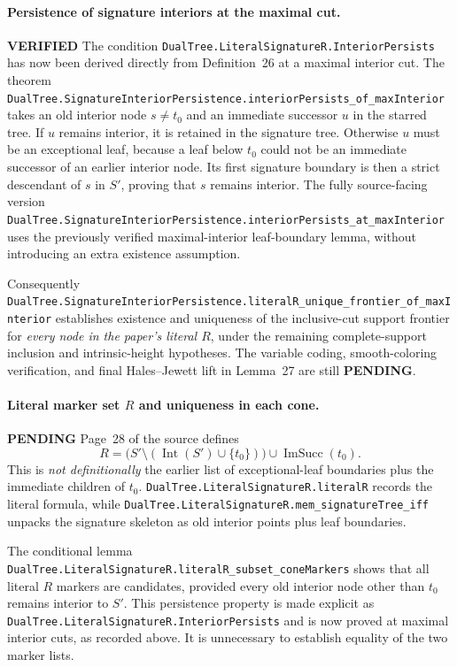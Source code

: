 \documentclass[11pt]{article}
\newcommand{\ok}{\textcolor{green!40!black}{\textbf{VERIFIED}}}
\newcommand{\todo}{\textcolor{gray!70!black}{\textbf{PENDING}}}
\newcommand{\lean}[1]{\texttt{#1}}
\begin{document}
\paragraph{Persistence of signature interiors at the maximal cut.} \ok
The condition \lean{DualTree.LiteralSignatureR.InteriorPersists}
has now been derived directly from Definition~26 at a maximal interior
cut.  The theorem
\lean{DualTree.SignatureInteriorPersistence.interiorPersists_of_maxInterior}
takes an old interior node $s\ne t_0$ and an immediate successor $u$
in the starred tree.  If $u$ remains interior, it is retained in the
signature tree.  Otherwise $u$ must be an exceptional leaf, because
a leaf below $t_0$ could not be an immediate successor of an earlier
interior node.  Its first signature boundary is then a strict
descendant of $s$ in $S'$, proving that $s$ remains interior.
The fully source-facing version
\lean{DualTree.SignatureInteriorPersistence.interiorPersists_at_maxInterior}
uses the previously verified maximal-interior leaf-boundary lemma,
without introducing an extra existence assumption.

Consequently
\lean{DualTree.SignatureInteriorPersistence.literalR_unique_frontier_of_maxInterior}
establishes existence and uniqueness of the inclusive-cut support frontier
for \emph{every node in the paper's literal $R$}, under the remaining
complete-support inclusion and intrinsic-height hypotheses.
The variable coding, smooth-coloring verification, and final
Hales--Jewett lift in Lemma~27 are still \todo.

\paragraph{Literal marker set $R$ and uniqueness in each cone.} \todo
Page~28 of the source defines
\[
R=\bigl(S'\setminus(\operatorname{Int}(S')\cup\{t_0\})\bigr)
  \cup\operatorname{ImSucc}(t_0).
\]
This is \emph{not definitionally} the earlier list of exceptional-leaf
boundaries plus the immediate children of $t_0$.
\lean{DualTree.LiteralSignatureR.literalR} records the literal formula,
while \lean{DualTree.LiteralSignatureR.mem_signatureTree_iff}
unpacks the signature skeleton as old interior points plus leaf boundaries.

The conditional lemma
\lean{DualTree.LiteralSignatureR.literalR_subset_coneMarkers}
shows that all literal $R$ markers are candidates, provided every old
interior node other than $t_0$ remains interior to $S'$.
This persistence property is made explicit as
\lean{DualTree.LiteralSignatureR.InteriorPersists} and is now proved
at maximal interior cuts, as recorded above.
It is unnecessary to establish equality of the two marker lists.
\end{document}
